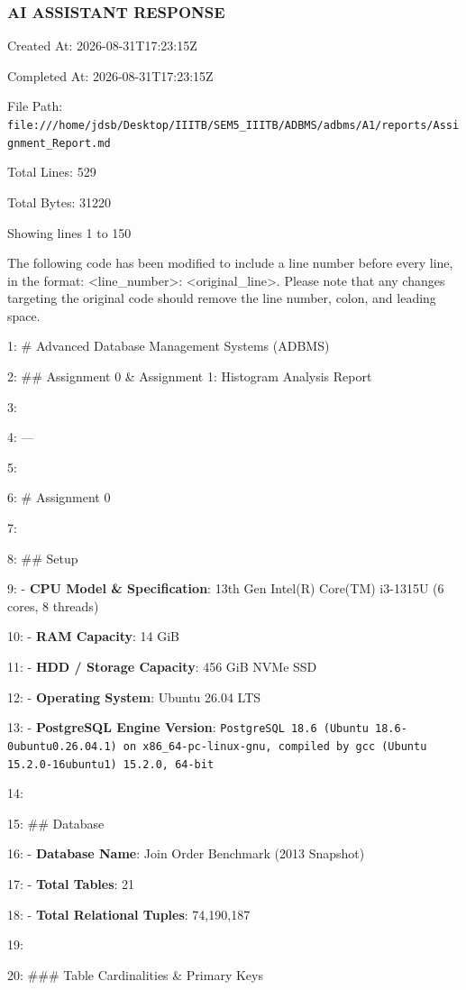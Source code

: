 \documentclass[11pt,a4paper]{article}
\begin{document}
\subsubsection{AI ASSISTANT RESPONSE}

Created At: 2026-08-31T17:23:15Z

Completed At: 2026-08-31T17:23:15Z

File Path: \texttt{file:///home/jdsb/Desktop/IIITB/SEM5\_IIITB/ADBMS/adbms/A1/reports/Assignment\_Report.md}

Total Lines: 529

Total Bytes: 31220

Showing lines 1 to 150

The following code has been modified to include a line number before every line, in the format: <line\_number>: <original\_line>. Please note that any changes targeting the original code should remove the line number, colon, and leading space.

1: \# Advanced Database Management Systems (ADBMS)

2: \#\# Assignment 0 \& Assignment 1: Histogram Analysis Report

3:

4: ---

5:

6: \# Assignment 0

7:

8: \#\# Setup

9: - \textbf{CPU Model \& Specification}: 13th Gen Intel(R) Core(TM) i3-1315U (6 cores, 8 threads)

10: - \textbf{RAM Capacity}: 14 GiB

11: - \textbf{HDD / Storage Capacity}: 456 GiB NVMe SSD

12: - \textbf{Operating System}: Ubuntu 26.04 LTS

13: - \textbf{PostgreSQL Engine Version}: \texttt{PostgreSQL 18.6 (Ubuntu 18.6-0ubuntu0.26.04.1) on x86\_64-pc-linux-gnu, compiled by gcc (Ubuntu 15.2.0-16ubuntu1) 15.2.0, 64-bit}

14:

15: \#\# Database

16: - \textbf{Database Name}: Join Order Benchmark (2013 Snapshot)

17: - \textbf{Total Tables}: 21

18: - \textbf{Total Relational Tuples}: 74,190,187

19:

20: \#\#\# Table Cardinalities \& Primary Keys
\end{document}

